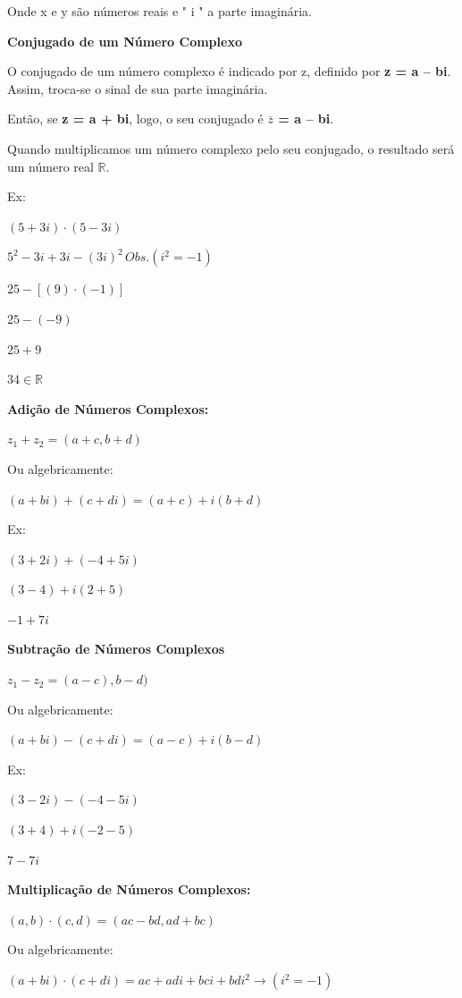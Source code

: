 \begin{multicols*}{2}
		Onde x e y são números reais e " i " a parte imaginária.
		
		\textbf{Conjugado de um Número Complexo}
		
		O conjugado de um número complexo é indicado por z, definido por \textbf{\color{blue}z = a – bi}. Assim, troca-se o sinal de sua parte imaginária.

		Então, se \textbf{\color{blue}z = a + bi}, logo, o seu conjugado é \textbf{\color{blue}$\overline{z}$ = a – bi}.

		Quando multiplicamos um número complexo pelo seu conjugado, o resultado será um número real $\mathbb{R}$.
		
		Ex:
		
       	$ (5 + 3i) \cdot (5 - 3i) $
		
		$ 5^2 - 3i + 3i - (3i)^2 \, Obs. (i^2 = -1)$
				
		$ 25 - [(9) \cdot (-1)] $
				
		$ 25 - (-9)$
		
		$ 25 + 9 $
				
		$ 34 \in \mathbb{R}$
				
		\textbf{Adição de Números Complexos:}
		
		$ z_1 + z_2 = ( a + c, b + d)$
		
		Ou algebricamente:
		
		$(a + bi) + (c + di) = (a + c) + i(b + d)$
		
		Ex:
		
		$(3 + 2i) + (-4 + 5i)$
		
		$(3 - 4) + i(2 + 5)$
				
		$ -1 + 7i$
				
		\textbf{Subtração de Números Complexos}
		
		$z_1 - z_2 = (a -c), b -d)$
		
		Ou algebricamente:
		
		$(a + bi) - (c + di) = (a - c) + i(b - d)$
		
		Ex:
		
		$(3 - 2i) - (-4 - 5i)$
		
		$(3 + 4) + i(-2 - 5)$
				
		$ 7 - 7i$
		
		\textbf{Multiplicação de Números Complexos:}
		
		$ (a, b) \cdot (c, d) = (ac - bd, ad + bc) $
		
		Ou algebricamente:
		
		$ (a + bi) \cdot (c + di) = ac +adi + bci +bdi^2 \longrightarrow (i^2 = -1) $
		

\end{multicols*}
